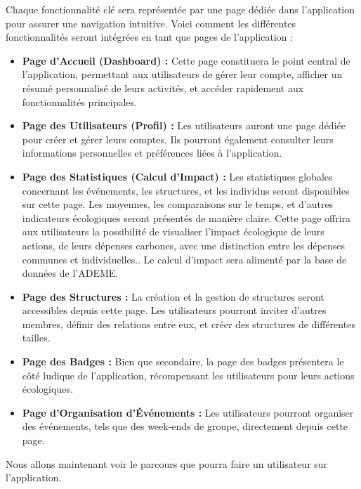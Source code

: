 
Chaque fonctionnalité clé sera représentée par une page dédiée dans l'application pour assurer une navigation intuitive. Voici comment les différentes fonctionnalités seront intégrées en tant que pages de l'application :

\begin{itemize}[label=-]
    \item \textbf{Page d'Accueil (Dashboard) :} Cette page constituera le point central de l'application, permettant aux utilisateurs de gérer leur compte, afficher un résumé personnalisé de leurs activités, et accéder rapidement aux fonctionnalités principales.

    \item \textbf{Page des Utilisateurs (Profil) :} Les utilisateurs auront une page dédiée pour créer et gérer leurs comptes. Ils pourront également consulter leurs informations personnelles et préférences liées à l'application.

    \item \textbf{Page des Statistiques (Calcul d'Impact) :} Les statistiques globales concernant les événements, les structures, et les individus seront disponibles sur cette page. Les moyennes, les comparaisons sur le temps, et d'autres indicateurs écologiques seront présentés de manière claire. Cette page offrira aux utilisateurs la possibilité de visualiser l'impact écologique de leurs actions, de leurs dépenses carbones, avec une distinction entre les dépenses communes et individuelles.. Le calcul d'impact sera alimenté par la base de données de l'ADEME. 

    \item \textbf{Page des Structures :} La création et la gestion de structures seront accessibles depuis cette page. Les utilisateurs pourront inviter d'autres membres, définir des relations entre eux, et créer des structures de différentes tailles.

    \item \textbf{Page des Badges :} Bien que secondaire, la page des badges présentera le côté ludique de l'application, récompensant les utilisateurs pour leurs actions écologiques.

    \item \textbf{Page d'Organisation d'Événements :} Les utilisateurs pourront organiser des événements, tels que des week-ends de groupe, directement depuis cette page.

\end{itemize}
Nous allons maintenant voir le parcours que pourra faire un utilisateur sur l'application. \\
